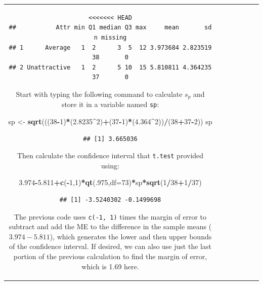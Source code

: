 \documentclass[]{book}
\newenvironment{Shaded}{\begin{snugshade}}{\end{snugshade}}
\newcommand{\KeywordTok}[1]{\textcolor[rgb]{0.13,0.29,0.53}{\textbf{#1}}}
\newcommand{\DataTypeTok}[1]{\textcolor[rgb]{0.13,0.29,0.53}{#1}}
\newcommand{\DecValTok}[1]{\textcolor[rgb]{0.00,0.00,0.81}{#1}}
\newcommand{\FloatTok}[1]{\textcolor[rgb]{0.00,0.00,0.81}{#1}}
\newcommand{\StringTok}[1]{\textcolor[rgb]{0.31,0.60,0.02}{#1}}
\newcommand{\OperatorTok}[1]{\textcolor[rgb]{0.81,0.36,0.00}{\textbf{#1}}}
\newcommand{\NormalTok}[1]{#1}
\theoremstyle{definition}
\theoremstyle{definition}
\theoremstyle{remark}
\begin{document}
\begin{longtable}[]{@{}ccccccc@{}}
\begin{minipage}[b]{0.10\columnwidth}
\begin{Shaded}
\begin{Highlighting}[]
\begin{Shaded}
\begin{Highlighting}[]
\begin{Shaded}
\begin{Highlighting}[]
\begin{Shaded}
\begin{Highlighting}[]
\begin{verbatim}
<<<<<<< HEAD
##           Attr min Q1 median Q3 max     mean       sd  n missing
## 1      Average   1  2      3  5  12 3.973684 2.823519 38       0
## 2 Unattractive   1  2      5 10  15 5.810811 4.364235 37       0
\end{verbatim}

Start with typing the following command to calculate \(s_p\) and store
it in a variable named \texttt{sp}:

\begin{Shaded}
\begin{Highlighting}[]
\NormalTok{sp <-}\StringTok{ }\KeywordTok{sqrt}\NormalTok{(((}\DecValTok{38}\OperatorTok{-}\DecValTok{1}\NormalTok{)}\OperatorTok{*}\NormalTok{(}\FloatTok{2.8235}\OperatorTok{^}\DecValTok{2}\NormalTok{)}\OperatorTok{+}\NormalTok{(}\DecValTok{37}\OperatorTok{-}\DecValTok{1}\NormalTok{)}\OperatorTok{*}\NormalTok{(}\FloatTok{4.364}\OperatorTok{^}\DecValTok{2}\NormalTok{))}\OperatorTok{/}\NormalTok{(}\DecValTok{38}\OperatorTok{+}\DecValTok{37}\OperatorTok{-}\DecValTok{2}\NormalTok{))}
\NormalTok{sp}
\end{Highlighting}
\end{Shaded}

\begin{verbatim}
## [1] 3.665036
\end{verbatim}

Then calculate the confidence interval that \texttt{t.test} provided
using:

\begin{Shaded}
\begin{Highlighting}[]
\FloatTok{3.974}\OperatorTok{-}\FloatTok{5.811}\OperatorTok{+}\KeywordTok{c}\NormalTok{(}\OperatorTok{-}\DecValTok{1}\NormalTok{,}\DecValTok{1}\NormalTok{)}\OperatorTok{*}\KeywordTok{qt}\NormalTok{(.}\DecValTok{975}\NormalTok{,}\DataTypeTok{df=}\DecValTok{73}\NormalTok{)}\OperatorTok{*}\NormalTok{sp}\OperatorTok{*}\KeywordTok{sqrt}\NormalTok{(}\DecValTok{1}\OperatorTok{/}\DecValTok{38}\OperatorTok{+}\DecValTok{1}\OperatorTok{/}\DecValTok{37}\NormalTok{)}
\end{Highlighting}
\end{Shaded}

\begin{verbatim}
## [1] -3.5240302 -0.1499698
\end{verbatim}

The previous code uses \texttt{c(-1,\ 1)} times the margin of error to
subtract and add the ME to the difference in the sample means
(\(3.974-5.811\)), which generates the lower and then upper bounds of
the confidence interval. If desired, we can also use just the last
portion of the previous calculation to find the margin of error, which
is 1.69 here.


\end{Highlighting}
\end{Shaded}
\end{Highlighting}
\end{Shaded}
\end{Highlighting}
\end{Shaded}
\end{Highlighting}
\end{Shaded}
\end{minipage}
\end{longtable}
\end{document}
